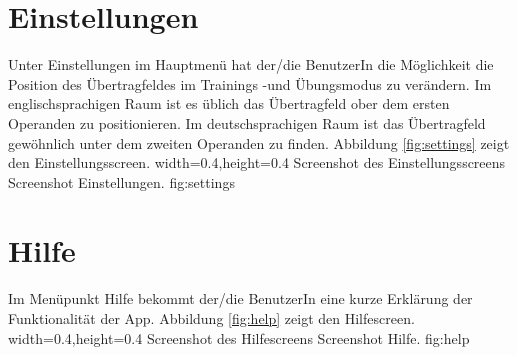 \section{Einstellungen}
\label{sec:settings}
Unter Einstellungen im Hauptmenü hat der/die BenutzerIn die Möglichkeit die Position des Übertragfeldes
im Trainings -und Übungsmodus zu verändern. Im englischsprachigen Raum ist es üblich das Übertragfeld
ober dem ersten Operanden zu positionieren. Im deutschsprachigen Raum ist das Übertragfeld gewöhnlich
unter dem zweiten Operanden zu finden. Abbildung \ref{fig:settings} zeigt den Einstellungsscreen.
  {width=0.4\textwidth,height=0.4\textheight}%
  {Screenshot des Einstellungsscreens}%
  {Screenshot Einstellungen.}%
  {fig:settings}%



\section{Hilfe}
\label{sec:help}

Im Menüpunkt Hilfe bekommt der/die BenutzerIn eine kurze Erklärung der Funktionalität der App.
Abbildung \ref{fig:help} zeigt den Hilfescreen.
  {width=0.4\textwidth,height=0.4\textheight}%
  {Screenshot des Hilfescreens}%
  {Screenshot Hilfe.}%
  {fig:help}%
  

  





